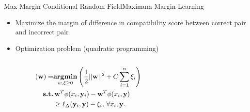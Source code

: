 \documentclass[first=dgreen,second=purple,logo=yellowexc]{aaltoslides}
\newcommand{\argmin}{\textbf{argmin}}
\newcommand{\yb}{{\bf y}}
\newcommand{\wb}{{\bf w}}
\begin{document}
\begin{frame}{Max-Margin Conditional Random Field}{Maximum Margin Learning}
\begin{itemize}
    \item Maximize the margin of difference in compatibility score between correct pair and incorrect pair
    \item Optimization problem (quadratic programming)
    \begin{columns}
        \begin{column}{.3\linewidth}
            \begin{align*}
            (\wb) =& \underset{w,\xi\ge0}{\operatorname{\argmin}}\left(\frac{1}{2}||\wb||^2+C\sum_{i=1}^{n}{\xi_i}\right)\\
            \textbf{s.t.} & \, \wb^T\phi(x_i,\yb_i)-\wb^T\phi(x_i,\yb)\\
            & \ge\ell_\Delta(\yb_i,\yb)-\xi_i, \, \forall x_i,\yb.
            \end{align*}
        \end{column}
        \begin{column}{.3\linewidth}
        \begin{figure}

\end{figure}
\end{column}
\end{columns}
\end{itemize}
\end{frame}
\end{document}
